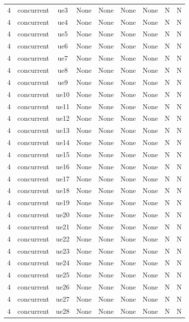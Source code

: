 \begin{table}[ht]
\begin{tabular}{|c|c|c|c|c|c|c|c|c|}
4 & concurrent & ue3 & None & None & None & None & N & N \\
4 & concurrent & ue4 & None & None & None & None & N & N \\
4 & concurrent & ue5 & None & None & None & None & N & N \\
4 & concurrent & ue6 & None & None & None & None & N & N \\
4 & concurrent & ue7 & None & None & None & None & N & N \\
4 & concurrent & ue8 & None & None & None & None & N & N \\
4 & concurrent & ue9 & None & None & None & None & N & N \\
4 & concurrent & ue10 & None & None & None & None & N & N \\
4 & concurrent & ue11 & None & None & None & None & N & N \\
4 & concurrent & ue12 & None & None & None & None & N & N \\
4 & concurrent & ue13 & None & None & None & None & N & N \\
4 & concurrent & ue14 & None & None & None & None & N & N \\
4 & concurrent & ue15 & None & None & None & None & N & N \\
4 & concurrent & ue16 & None & None & None & None & N & N \\
4 & concurrent & ue17 & None & None & None & None & N & N \\
4 & concurrent & ue18 & None & None & None & None & N & N \\
4 & concurrent & ue19 & None & None & None & None & N & N \\
4 & concurrent & ue20 & None & None & None & None & N & N \\
4 & concurrent & ue21 & None & None & None & None & N & N \\
4 & concurrent & ue22 & None & None & None & None & N & N \\
4 & concurrent & ue23 & None & None & None & None & N & N \\
4 & concurrent & ue24 & None & None & None & None & N & N \\
4 & concurrent & ue25 & None & None & None & None & N & N \\
4 & concurrent & ue26 & None & None & None & None & N & N \\
4 & concurrent & ue27 & None & None & None & None & N & N \\
4 & concurrent & ue28 & None & None & None & None & N & N \\

\end{tabular}
\end{table}
